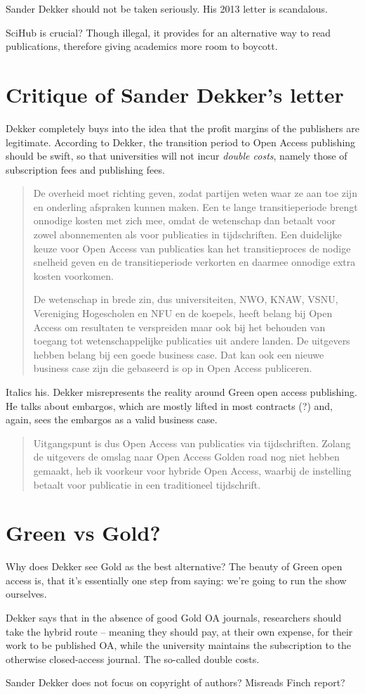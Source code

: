 \documentclass[12pt,twocolumn, openany, article]{memoir}
\begin{document}
Sander Dekker should not be taken seriously. His 2013 letter is
scandalous.

SciHub is crucial? Though illegal, it provides for an alternative way to
read publications, therefore giving academics more room to boycott.

\section*{Critique of Sander Dekker's letter}
Dekker completely buys into the idea that the profit margins of the publishers are legitimate.
According to Dekker, the transition period to Open Access publishing should be swift,
so that universities will not incur \emph{double costs}, namely those of subscription fees and publishing fees.
\begin{quote}
De overheid moet richting geven, zodat partijen weten waar ze aan toe zijn en onderling afspraken kunnen
maken.
Een te lange transitieperiode brengt onnodige kosten met zich mee,
omdat de wetenschap dan betaalt voor zowel abonnementen als voor publicaties in tijdschriften.
Een duidelijke keuze voor Open Access van publicaties kan het transitieproces de nodige snelheid geven en de
transitieperiode verkorten en daarmee onnodige extra kosten voorkomen.

\textelp{}

De wetenschap in brede zin, dus universiteiten, NWO, KNAW, VSNU,
Vereniging Hogescholen en NFU en de koepels, heeft belang bij Open Access om resultaten te verspreiden maar ook bij het
behouden van toegang tot wetenschappelijke publicaties uit andere landen.
De uitgevers hebben belang bij een goede business case.
Dat kan ook een nieuwe business case zijn die gebaseerd is op in Open Access publiceren.
\end{quote}

Italics his. Dekker misrepresents the reality around Green open access publishing.
He talks about embargos, which are mostly lifted in most contracts (?) and,
again, sees the embargos as a valid business case.

\begin{quote}
  Uitgangspunt is dus Open Access van publicaties via tijdschriften.
  Zolang de uitgevers de omslag naar Open Access Golden road nog niet hebben gemaakt,
  heb ik voorkeur voor hybride Open Access, waarbij de instelling betaalt voor publicatie in een traditioneel
  tijdschrift.
\end{quote}


\section*{Green vs Gold?}
Why does Dekker see Gold as the best alternative?
The beauty of Green open access is, that it's essentially one step from saying:
we're going to run the show ourselves.

Dekker says that in the absence of good Gold OA journals, researchers should take the hybrid route -- meaning they
should pay, at their own expense, for their work to be published OA,
while the university maintains the subscription to the otherwise closed-access journal. The so-called double costs.

Sander Dekker does not focus on copyright of authors? Misreads Finch report?
\end{document}
